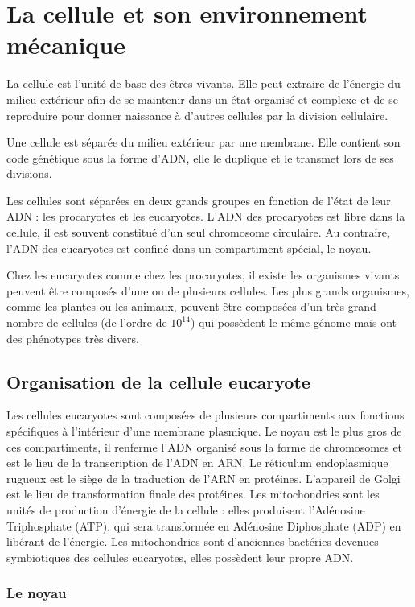 \documentclass{report}
\begin{document}
\chapter{La cellule et son environnement mécanique}


La cellule est l'unité de base des êtres vivants. Elle peut extraire de l'énergie du milieu extérieur afin de se maintenir dans un état organisé et complexe et de se reproduire pour donner naissance à d'autres cellules par la division cellulaire. 

Une cellule est séparée du milieu extérieur par une membrane. Elle contient son code génétique sous la forme d'ADN, elle le duplique et le transmet lors de ses divisions. 

Les cellules sont séparées en deux grands groupes en fonction de l'état de leur ADN : les procaryotes et les eucaryotes. 
L'ADN des procaryotes est libre dans la cellule, il est souvent constitué d'un seul chromosome circulaire. 
Au contraire, l'ADN des eucaryotes est confiné dans un compartiment spécial, le noyau. 

Chez les eucaryotes comme chez les procaryotes, il existe les organismes vivants peuvent être composés d'une ou de plusieurs cellules. 
Les plus grands organismes, comme les plantes ou les animaux, peuvent être composées d'un très grand nombre de cellules (de l'ordre de $10^{14}$) qui possèdent le même génome mais ont des phénotypes très divers. 

\section{Organisation de la cellule eucaryote}


Les cellules eucaryotes sont composées de plusieurs compartiments aux fonctions spécifiques à l'intérieur d'une membrane plasmique. Le noyau est le plus gros de ces compartiments, il renferme l'ADN organisé sous la forme de chromosomes et est le lieu de la transcription de l'ADN en ARN. 
Le réticulum endoplasmique rugueux est le siège de la traduction de l'ARN en protéines. 
L'appareil de Golgi est le lieu de transformation finale des protéines. 
Les mitochondries sont les unités de production d'énergie de la cellule : elles produisent l'Adénosine Triphosphate (ATP), qui sera transformée en Adénosine Diphosphate (ADP) en libérant de l'énergie. Les mitochondries sont d'anciennes bactéries devenues symbiotiques des cellules eucaryotes, elles possèdent leur propre ADN. 


\subsection{Le noyau}
\end{document}

